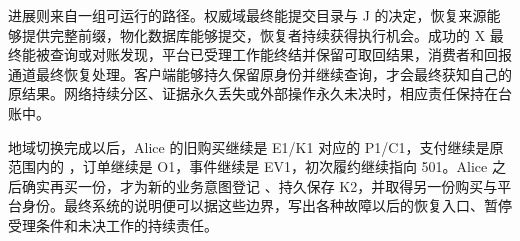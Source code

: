 进展则来自一组可运行的路径。权威域最终能提交目录与 J 的决定，恢复来源能够提供完整前缀，物化数据库能够提交，恢复者持续获得执行机会。成功的 X 最终能被查询或对账发现，平台已受理工作能终结并保留可取回结果，消费者和回报通道最终恢复处理。客户端能够持久保留原身份并继续查询，才会最终获知自己的原结果。网络持续分区、证据永久丢失或外部操作永久未决时，相应责任保持在台账中。

地域切换完成以后，Alice 的旧购买继续是 E1/K1 对应的 P1/C1，支付继续是原范围内的 ，订单继续是 O1，事件继续是 EV1，初次履约继续指向 501。Alice 之后确实再买一份，才为新的业务意图登记 、持久保存 K2，并取得另一份购买与平台身份。最终系统的说明便可以据这些边界，写出各种故障以后的恢复入口、暂停受理条件和未决工作的持续责任。
\FloatBarrier
